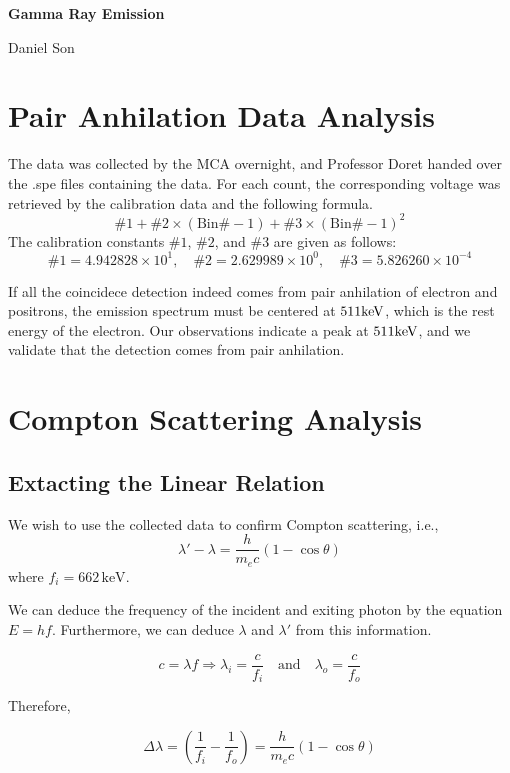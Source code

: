 \documentclass{article}
\numberwithin{equation}{section}
\begin{document}
\begin{center}
    \Large
    \textbf{Gamma Ray Emission}

    \large
    Daniel Son
\end{center}


\section{Pair Anhilation Data Analysis}
The data was collected by the MCA overnight, and Professor Doret 
handed over the .spe files containing the data. For each count, 
the corresponding voltage was retrieved by the calibration data 
and the following formula. 
\[
\#1 + \#2 \times (\text{Bin\#} - 1) + \#3 \times (\text{Bin\#} - 1)^2
\]
The calibration constants \(\#1\), \(\#2\), and \(\#3\) are given as follows:
\[
\#1 = 4.942828 \times 10^{1}, \quad \#2 = 2.629989 \times 10^{0}, \quad \#3 = 5.826260 \times 10^{-4}
\]


If all the coincidece detection indeed comes from pair anhilation of
electron and positrons, the 
emission spectrum must be centered at $511\rm keV$, which is the rest 
energy of the electron. Our observations indicate a peak at $511\rm keV$, 
and we validate that the detection comes from pair anhilation.  



\section{Compton Scattering Analysis}

\subsection{Extacting the Linear Relation}

We wish to use the collected data to confirm Compton scattering, i.e.,
\[
\lambda' - \lambda = \frac{h}{m_e c} (1 - \cos \theta)
\]
where \( f_i = 662 \, \text{keV} \).

We can deduce 
the frequency of the incident and exiting photon by the equation 
$E = hf$. Furthermore,  
we can deduce \( \lambda \) and \( \lambda' \) from this information.

\[
c = \lambda f \Rightarrow \lambda_i = \frac{c}{f_i} \quad \text{and} \quad \lambda_o = \frac{c}{f_o}
\]

Therefore,

\[
\Delta \lambda = \left( \frac{1}{f_i} - \frac{1}{f_o} \right) = \frac{h}{m_e c} (1 - \cos \theta)
\]
\end{document}

